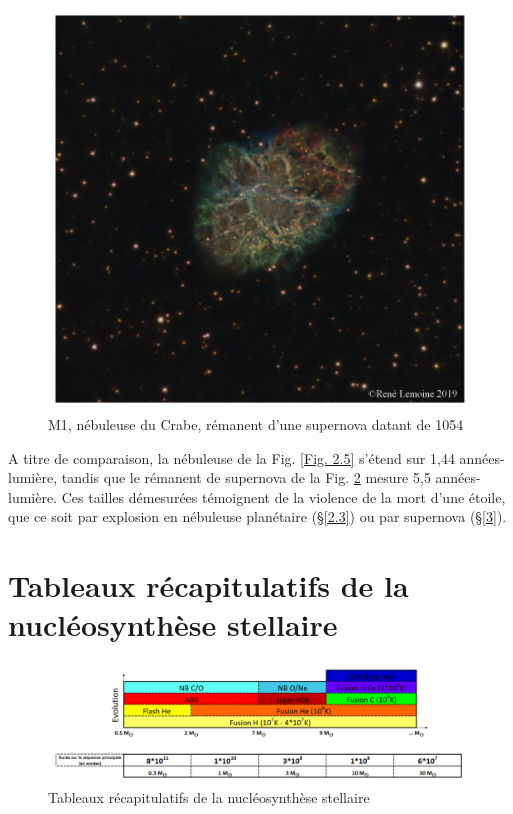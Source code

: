 \begin{figure}[H]
	\centering
	\includegraphics[scale=0.3]{images/m1}
	\caption[M1, nébuleuse du Crabe - astrophoto prise par René Lemoine le 29 janvier 2019 avec un Celestron 8 (6h de pose)]{M1, nébuleuse du Crabe, rémanent d'une supernova datant de 1054}
	\label{Fig. 2.7}
\end{figure}

A titre de comparaison, la nébuleuse de la Fig. \ref{Fig. 2.5} s'étend sur 1,44 années-lumière, tandis que le rémanent de supernova de la Fig. \ref{Fig. 2.7} mesure 5,5 années-lumière. Ces tailles démesurées témoignent de la violence de la mort d'une étoile, que ce soit par explosion en nébuleuse planétaire (§\ref{2.3}) ou par supernova (§\ref{3}). 

\section{Tableaux récapitulatifs de la nucléosynthèse stellaire}\label{2.5}

\begin{figure}[H]
	\centering
	\includegraphics[scale=0.42]{images/evo_stel_tab}
	\caption[Tableaux récapitulatifs de la nucléosynthèse stellaire - composé avec Excel 2016 ]{Tableaux récapitulatifs de la nucléosynthèse stellaire}
	\label{Fig. 2.7}
\end{figure}


